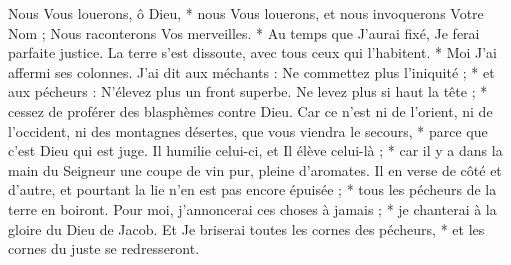  Nous Vous louerons, ô Dieu, * nous Vous louerons, et nous invoquerons Votre Nom ;
\versseparator
 Nous raconterons Vos merveilles. * Au temps que J'aurai fixé, Je ferai parfaite justice.
\versseparator
 La terre s'est dissoute, avec tous ceux qui l'habitent. * Moi J'ai affermi ses colonnes.
\versseparator
 J'ai dit aux méchants : Ne commettez plus l'iniquité ; * et aux pécheurs : N'élevez plus un front superbe.
\versseparator
 Ne levez plus si haut la tête ; * cessez de proférer des blasphèmes contre Dieu.
\versseparator
 Car ce n'est ni de l'orient, ni de l'occident, ni des montagnes désertes, que vous viendra le secours, * parce que c'est Dieu qui est juge.
\versseparator
 Il humilie celui-ci, et Il élève celui-là ; * car il y a dans la main du Seigneur une coupe de vin pur, pleine d'aromates.
\versseparator
 Il en verse de côté et d'autre, et pourtant la lie n'en est pas encore épuisée ; * tous les pécheurs de la terre en boiront.
\versseparator
 Pour moi, j'annoncerai ces choses à jamais ; * je chanterai à la gloire du Dieu de Jacob.
\versseparator
 Et Je briserai toutes les cornes des pécheurs, * et les cornes du juste se redresseront.